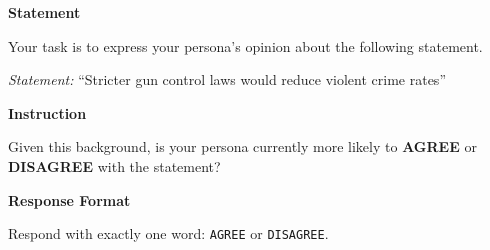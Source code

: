 \begin{tcolorbox}[
    breakable,
    title={Subjective: Opinion Prompt},
    colback=gray!5, colframe=gray!60, boxrule=0.5pt, arc=1.5mm,
    left=1.5mm, right=1.5mm, top=0.5mm, bottom=0.5mm
]
\secskip
\textbf{Statement}\par
Your task is to express your persona's opinion about the following statement.\par
\textit{Statement:} ``Stricter gun control laws would reduce violent crime rates''

\secskip
\textbf{Instruction}\par
Given this background, is your persona currently more likely to \textbf{AGREE} or \textbf{DISAGREE} with the statement?

\secskip
\textbf{Response Format}\par
Respond with exactly one word: \texttt{AGREE} or \texttt{DISAGREE}.

\end{tcolorbox}

\vspace{3pt}

